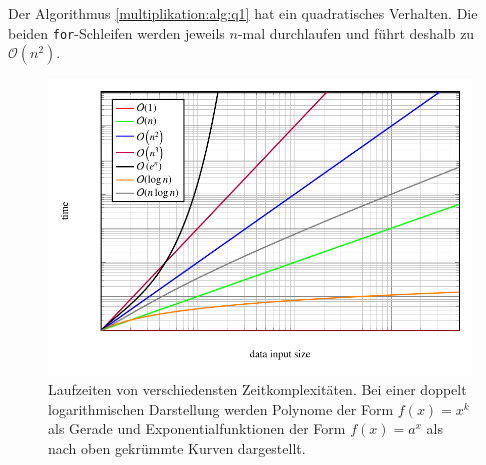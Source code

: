 Der Algorithmus \ref{multiplikation:alg:q1} hat ein quadratisches Verhalten.
Die beiden \texttt{for}-Schleifen werden jeweils $n$-mal durchlaufen und f\"uhrt deshalb zu $\mathcal{O} (n^2 )$.


\begin{figure}
	\center
	\includegraphics[]{papers/multiplikation/images/bigo}
	\caption{Laufzeiten von verschiedensten Zeitkomplexitäten. Bei einer doppelt logarithmischen Darstellung werden Polynome der Form $f(x) = x^k$ als Gerade und Exponentialfunktionen der Form $f(x) = a^x$ als nach oben gekr\"ummte Kurven dargestellt.}
	\label{multiplikation:fig:bigo}
\end{figure}

